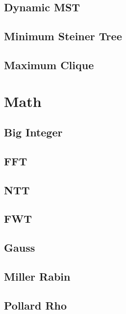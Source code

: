 \documentclass[a4paper,10pt,twocolumn,oneside]{article}
\begin{document}
\subsection{Dynamic MST}


\subsection{Minimum Steiner Tree}


\subsection{Maximum Clique}


\section{Math}
\subsection{Big Integer}


\subsection{FFT}


\subsection{NTT}


\subsection{FWT}


\subsection{Gauss}


\subsection{Miller Rabin}


\subsection{Pollard Rho}

\end{document}

